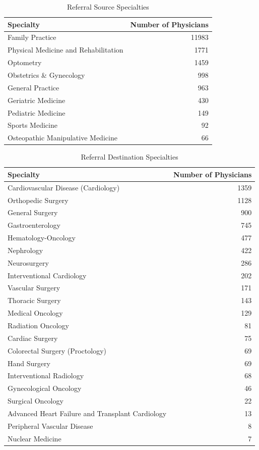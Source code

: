 \documentclass[
  12pt,
]{article}
\begin{document}
\FloatBarrier

\begin{table}

\caption{\label{tab:src}Referral Source Specialties}
\centering
\begin{tabular}[t]{lr}
\toprule
Specialty & Number of Physicians\\
\midrule
Family Practice & 11983\\
Physical Medicine and Rehabilitation & 1771\\
Optometry & 1459\\
Obstetrics \& Gynecology & 998\\
General Practice & 963\\
\addlinespace
Geriatric Medicine & 430\\
Pediatric Medicine & 149\\
Sports Medicine & 92\\
Osteopathic Manipulative Medicine & 66\\
\bottomrule
\end{tabular}
\end{table}

\FloatBarrier

\begin{table}

\caption{\label{tab:dest}Referral Destination Specialties}
\centering
\begin{tabular}[t]{lr}
\toprule
Specialty & Number of Physicians\\
\midrule
Cardiovascular Disease (Cardiology) & 1359\\
Orthopedic Surgery & 1128\\
General Surgery & 900\\
Gastroenterology & 745\\
Hematology-Oncology & 477\\
\addlinespace
Nephrology & 422\\
Neurosurgery & 286\\
Interventional Cardiology & 202\\
Vascular Surgery & 171\\
Thoracic Surgery & 143\\
\addlinespace
Medical Oncology & 129\\
Radiation Oncology & 81\\
Cardiac Surgery & 75\\
Colorectal Surgery (Proctology) & 69\\
Hand Surgery & 69\\
\addlinespace
Interventional Radiology & 68\\
Gynecological Oncology & 46\\
Surgical Oncology & 22\\
Advanced Heart Failure and Transplant Cardiology & 13\\
Peripheral Vascular Disease & 8\\
\addlinespace
Nuclear Medicine & 7\\
\bottomrule
\end{tabular}
\end{table}
\end{document}

